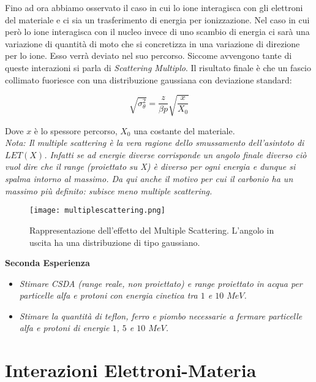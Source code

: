 \documentclass [a4paper, twoside] {book}
\begin{document}
Fino ad ora abbiamo osservato il caso in cui lo ione interagisca con gli elettroni del materiale e ci sia un trasferimento di energia per ionizzazione.
Nel caso in cui però lo ione interagisca con il nucleo invece di uno scambio di energia ci sarà una variazione di quantità di moto che si concretizza in una variazione di direzione per lo ione. Esso verrà deviato nel suo percorso. Siccome avvengono tante di queste interazioni si parla di \emph{Scattering Multiplo}. 
Il risultato finale è che un fascio collimato fuoriesce con una distribuzione gaussiana con deviazione standard:

\begin{equation}
\sqrt{\sigma_{\theta}^2}=\frac{z}{\beta p}\sqrt{\frac{x}{X_0}}
\end{equation}

Dove $x$ è lo spessore percorso, $X_0$ una costante del materiale.\\

\emph{Nota: Il multiple scattering è la vera ragione dello smussamento dell'asintoto di $LET(X)$. Infatti se ad energie diverse corrisponde un angolo finale diverso ciò vuol dire che il range (proiettato su X) è diverso per ogni energia e dunque si spalma intorno al massimo. Da qui anche il motivo per cui il carbonio ha un massimo più definito: subisce meno multiple scattering.}\\

\begin{figure}
\centering
	\texttt{[image: multiplescattering.png]}
	\caption{Rappresentazione dell'effetto del Multiple Scattering. L'angolo in uscita ha una distribuzione di tipo gaussiano.}
	\label{multiplescattering}
\end{figure}

\textbf{Seconda Esperienza}\\

\begin{itemize}
\item \emph{Stimare CSDA (range reale, non proiettato) e range proiettato in acqua per particelle alfa e protoni con energia cinetica tra $1$ e $10$ $MeV$.}
\item \emph{Stimare la quantità di teflon, ferro e piombo necessarie a fermare particelle alfa e protoni di energie $1$, $5$ e $10$ $MeV$.}
\end{itemize}

\section{Interazioni Elettroni-Materia}
\end{document}
